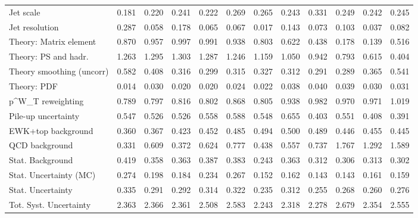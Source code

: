 \begin{tabular}{l|p{0.6cm}p{0.6cm}p{0.6cm}p{0.6cm}p{0.6cm}p{0.6cm}p{0.6cm}p{0.6cm}p{0.6cm}p{0.6cm}p{0.6cm}}
Jet scale                                & 0.181 & 0.220 & 0.241 & 0.222 & 0.269 & 0.265 & 0.243 & 0.331 & 0.249 & 0.242 & 0.245 \\
Jet resolution                           & 0.287 & 0.058 & 0.178 & 0.065 & 0.067 & 0.017 & 0.143 & 0.073 & 0.103 & 0.037 & 0.082 \\
Theory: Matrix element                   & 0.870 & 0.957 & 0.997 & 0.991 & 0.938 & 0.803 & 0.622 & 0.438 & 0.178 & 0.139 & 0.516 \\
Theory: PS and hadr.                     & 1.263 & 1.295 & 1.303 & 1.287 & 1.246 & 1.159 & 1.050 & 0.942 & 0.793 & 0.615 & 0.404 \\
Theory smoothing (uncorr)                & 0.582 & 0.408 & 0.316 & 0.299 & 0.315 & 0.327 & 0.312 & 0.291 & 0.289 & 0.365 & 0.541 \\
Theory: PDF                              & 0.014 & 0.030 & 0.020 & 0.020 & 0.024 & 0.022 & 0.038 & 0.040 & 0.039 & 0.030 & 0.031 \\
p^{W}_{T} reweighting                    & 0.789 & 0.797 & 0.816 & 0.802 & 0.868 & 0.805 & 0.938 & 0.982 & 0.970 & 0.971 & 1.019 \\
Pile-up uncertainty                      & 0.547 & 0.526 & 0.526 & 0.558 & 0.588 & 0.548 & 0.655 & 0.403 & 0.551 & 0.408 & 0.391 \\
EWK+top background                       & 0.360 & 0.367 & 0.423 & 0.452 & 0.485 & 0.494 & 0.500 & 0.489 & 0.446 & 0.455 & 0.445 \\
QCD background                           & 0.331 & 0.609 & 0.372 & 0.624 & 0.777 & 0.438 & 0.557 & 0.737 & 1.767 & 1.292 & 1.589 \\
Stat. Background                         & 0.419 & 0.358 & 0.363 & 0.387 & 0.383 & 0.243 & 0.363 & 0.312 & 0.306 & 0.313 & 0.302 \\
Stat. Uncertainty (MC)                   & 0.274 & 0.198 & 0.184 & 0.234 & 0.267 & 0.152 & 0.162 & 0.143 & 0.143 & 0.161 & 0.159 \\
\hline
Stat. Uncertainty                        & 0.335 & 0.291 & 0.292 & 0.314 & 0.322 & 0.235 & 0.312 & 0.255 & 0.268 & 0.260 & 0.276 \\
\hline
Tot. Syst. Uncertainty                   & 2.363 & 2.366 & 2.361 & 2.508 & 2.583 & 2.243 & 2.318 & 2.278 & 2.679 & 2.354 & 2.555 \\
\hline
\end{tabular}
